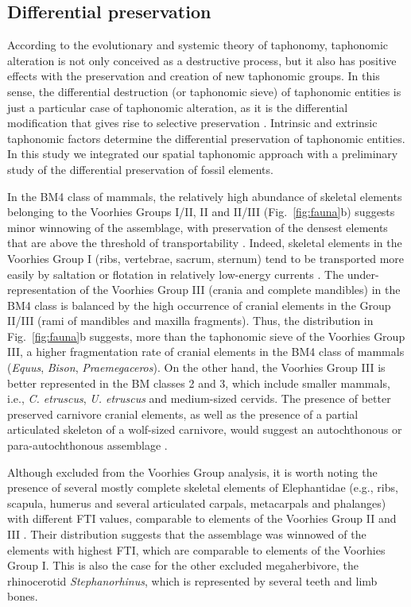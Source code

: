 \documentclass[5p,times,authoryear]{elsarticle}
\begin{document}
\subsection{Differential preservation}

According to the evolutionary and systemic theory of taphonomy, taphonomic alteration is not only conceived as a destructive process, but it also has positive effects with the preservation and creation of new taphonomic groups. In this sense, the differential destruction (or taphonomic sieve) of taphonomic entities is just a particular case of taphonomic alteration, as it is the differential modification that gives rise to selective preservation \citep{Fernandez-Lopez2006}. Intrinsic and extrinsic taphonomic factors determine the differential preservation of taphonomic entities. In this study we integrated our spatial taphonomic approach with a preliminary study of the differential preservation of fossil elements.

In the BM4 class of mammals, the relatively high abundance of skeletal elements belonging to the Voorhies Groups I/II, II and II/III (Fig.~\ref{fig:fauna}b) suggests minor winnowing of the assemblage, with preservation of the densest elements that are above the threshold of transportability \citep{Behrensmeyer1988}. Indeed, skeletal elements in the Voorhies Group I (ribs, vertebrae, sacrum, sternum) tend to be transported more easily by saltation or flotation in relatively low-energy currents \citep{Voorhies1969}. The under-representation of the Voorhies Group III (crania and complete mandibles) in the BM4 class is balanced by the high occurrence of cranial elements in the Group II/III (rami of mandibles and maxilla fragments). Thus, the distribution in Fig.~\ref{fig:fauna}b suggests, more than the taphonomic sieve of the Voorhies Group III, a higher fragmentation rate of cranial elements in the BM4 class of mammals (\emph{Equus}, \emph{Bison}, \emph{Praemegaceros}). On the other hand, the Voorhies Group III is better represented in the BM classes 2 and 3, which include smaller mammals, i.e., \emph{C. etruscus}, \emph{U. etruscus} and medium-sized cervids. The presence of better preserved carnivore cranial elements, as well as the presence of a partial articulated skeleton of a wolf-sized carnivore, would suggest an autochthonous or para-autochthonous assemblage \citep{Behrensmeyer1988}.

Although excluded from the Voorhies Group analysis, it is worth noting the presence of several mostly complete skeletal elements of Elephantidae (e.g., ribs, scapula, humerus and several articulated carpals, metacarpals and phalanges) with different FTI values, comparable to elements of the Voorhies Group II and III \citep{Frison1986}. Their distribution suggests that the assemblage was winnowed of the elements with highest FTI, which are comparable to elements of the Voorhies Group I. This is also the case for the other excluded megaherbivore, the rhinocerotid \emph{Stephanorhinus}, which is represented by several teeth and limb bones.
\end{document}

